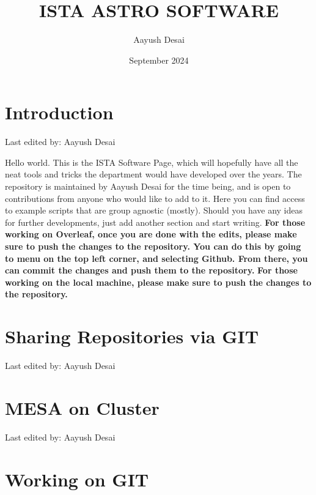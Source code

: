 \documentclass{article}
\title{ISTA ASTRO SOFTWARE}
\author{Aayush Desai}
\date{September 2024}
\newcommand{\setlasteditor}[1]{\gdef\lasteditor{#1}}
\newcommand{\lastedited}{%
    \vspace{1mm} {\footnotesize Last edited by: \lasteditor} \vspace{3mm}
    \newline

}
\begin{document}
\maketitle


\tableofcontents
\newpage
\section*{Introduction}
\setlasteditor{Aayush Desai}
\lastedited
\noindent
Hello world. This is the ISTA Software Page, which will hopefully have all the neat tools and tricks the department would have developed over the years. The repository is maintained by Aayush Desai for the time being, and is open to contributions from anyone who would like to add to it.
\newline
\noindent
Here you can find access to example scripts that are group agnostic (mostly). Should you have any ideas for further developments, just add another section and start writing.
\newline
\newline
\textbf{For those working on Overleaf, once you are done with the edits, please make sure to push the changes to the repository. You can do this by going to menu on the top left corner, and selecting Github. From there, you can commit the changes and push them to the repository.}
\newline
\newline
\textbf{For those working on the local machine, please make sure to push the changes to the repository.}
\section{Sharing Repositories via GIT}
\setlasteditor{Aayush Desai}
\lastedited

\section{MESA on Cluster}
\setlasteditor{Aayush Desai}
\lastedited

\section{Working on GIT}
\end{document}
